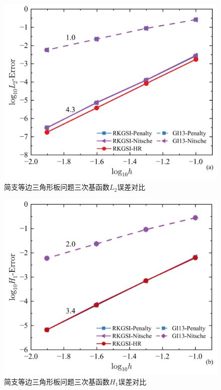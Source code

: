 \begin{figure}[H]
    \centering
    \includegraphics[scale=0.5]{figure/PHR/T/CL2.png}
    \caption{简支等边三角形板问题三次基函数$L_2$误差对比}\label{TCLH}
\end{figure}
\begin{figure}[H]
    \centering
    \includegraphics[scale=0.5]{figure/PHR/T/CH1.png}
    \caption{简支等边三角形板问题三次基函数$H_1$误差对比}
\end{figure}

